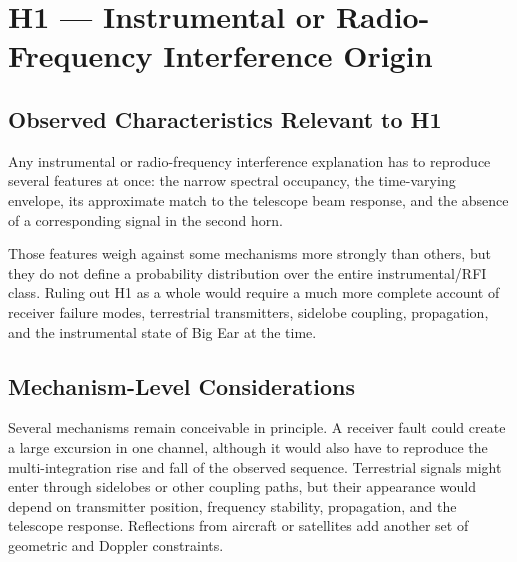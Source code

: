 \documentclass[crop]{CSL}
\begin{document}

\section{H1 --- Instrumental or Radio-Frequency Interference Origin}
\label{sec:h1}

\subsection{Observed Characteristics Relevant to H1}

Any instrumental or radio-frequency interference explanation has to reproduce several features at once: the narrow spectral occupancy, the time-varying envelope, its approximate match to the telescope beam response, and the absence of a corresponding signal in the second horn.

Those features weigh against some mechanisms more strongly than others, but they do not define a probability distribution over the entire instrumental/RFI class. Ruling out H1 as a whole would require a much more complete account of receiver failure modes, terrestrial transmitters, sidelobe coupling, propagation, and the instrumental state of Big Ear at the time.

\subsection{Mechanism-Level Considerations}

Several mechanisms remain conceivable in principle. A receiver fault could create a large excursion in one channel, although it would also have to reproduce the multi-integration rise and fall of the observed sequence. Terrestrial signals might enter through sidelobes or other coupling paths, but their appearance would depend on transmitter position, frequency stability, propagation, and the telescope response. Reflections from aircraft or satellites add another set of geometric and Doppler constraints.
\end{document}

